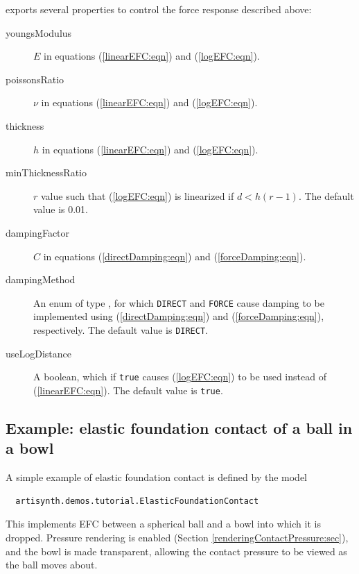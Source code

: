 exports several properties to control the force response described
above:

\begin{description}

\item[youngsModulus]\mbox{}

$E$ in equations (\ref{linearEFC:eqn}) and (\ref{logEFC:eqn}).

\item[poissonsRatio]\mbox{}

$\nu$ in equations (\ref{linearEFC:eqn}) and (\ref{logEFC:eqn}).

\item[thickness]\mbox{}

$h$ in equations (\ref{linearEFC:eqn}) and (\ref{logEFC:eqn}).

\item[minThicknessRatio]\mbox{}

$r$ value such that (\ref{logEFC:eqn}) is linearized if $d < h (r-1)$.
The default value is 0.01.

\item[dampingFactor]\mbox{}

$C$ in equations (\ref{directDamping:eqn}) and (\ref{forceDamping:eqn}).

\item[dampingMethod]\mbox{}

An enum of type
,
for which {\tt DIRECT} and {\tt FORCE} cause damping to be implemented
using (\ref{directDamping:eqn}) and (\ref{forceDamping:eqn}),
respectively. The default value is {\tt DIRECT}.

\item[useLogDistance]\mbox{}

A boolean, which if {\tt true} causes (\ref{logEFC:eqn})
to be used instead of (\ref{linearEFC:eqn}). The default
value is {\tt true}.

\end{description}

\subsection{Example: elastic foundation contact of a ball in a bowl}
\label{ElasticFoundationContactDemo:sec}

A simple example of elastic foundation contact is defined by the model
%
\begin{verbatim}
  artisynth.demos.tutorial.ElasticFoundationContact
\end{verbatim}
%
This implements EFC between a spherical ball and a bowl into which it
is dropped. Pressure rendering is enabled
(Section \ref{renderingContactPressure:sec}), and the bowl is made
transparent, allowing the contact pressure to be viewed as the ball
moves about.

